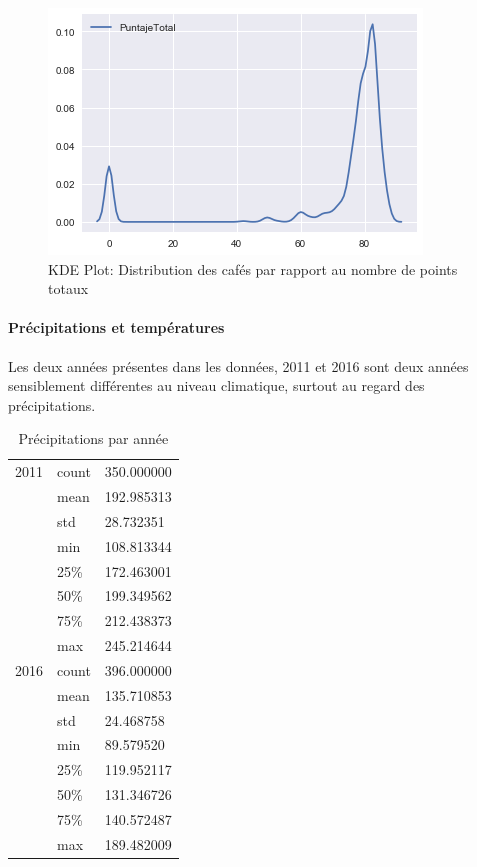 \begin{figure}[H]
	\centering
	\includegraphics[width=0.7\linewidth]{img/Exploration/kdeplotPuntajeTotal}
	\caption{KDE Plot: Distribution des cafés par rapport au nombre de points totaux}
	\label{fig:kdeplotpuntajetotal}
\end{figure}



\newpage
\paragraph{Précipitations et températures} Les deux années présentes dans les données, 2011 et 2016 sont deux années sensiblement différentes au niveau climatique, surtout au regard des précipitations.  

\begin{table}[H]
	\centering
	\caption{Précipitations par année}
	\label{YearlyPrec1}
	\begin{tabular}{lll}
		2011 & count                               & 350.000000 \\
		&mean & 192.985313                                      \\
		&std  & 28.732351                                       \\
		&min  & 108.813344                                     \\
		&25\% & 172.463001                                     \\
		&50\% & 199.349562                                      \\
		&75\% & 212.438373                                      \\
		&max  & 245.214644                                      \\
	2016 & count                               & 396.000000 \\
		&mean & 135.710853                                      \\
		&std  & 24.468758                                      \\
		&min  & 89.579520                                       \\
		&25\% & 119.952117                                      \\
		&50\% & 131.346726                                      \\
		&75\% & 140.572487                                      \\
		&max  & 189.482009                   
	\end{tabular}
\end{table}


